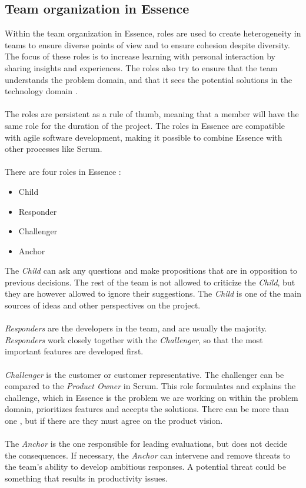 \subsection{Team organization in Essence}
\label{sec:team-organization}
Within the team organization in Essence, roles are used to create heterogeneity in teams to ensure diverse points of view and to ensure cohesion despite diversity.
The focus of these roles is to increase learning with personal interaction by sharing insights and experiences.
The roles also try to ensure that the team understands the problem domain, and that it sees the potential solutions in the technology domain \cite{Essence}.
\\\\
The roles are persistent as a rule of thumb, meaning that a member will have the same role for the duration of the project.
The roles in Essence are compatible with agile software development, making it possible to combine Essence with other processes like Scrum.
\\\\
There are four roles in Essence \cite{Essence}:
\begin{itemize}
    \item Child
    \item Responder
    \item Challenger
    \item Anchor
\end{itemize}
The \textit{Child} can ask any questions and make propositions that are in opposition to previous decisions.
The rest of the team is not allowed to criticize the \textit{Child}, but they are however allowed to ignore their suggestions.
The \textit{Child} is one of the main sources of ideas and other perspectives on the project.
\\\\
\textit{Responders} are the developers in the team, and are usually the majority.
\textit{Responders} work closely together with the \textit{Challenger}, so that the most important features are developed first.
\\\\
\textit{Challenger} is the customer or customer representative.
The challenger can be compared to the \textit{Product Owner} in Scrum.
This role formulates and explains the challenge, which in Essence is the problem we are working on within the problem domain, prioritizes features and accepts the solutions.
There can be more than one , but if there are they must agree on the product vision.
\\\\
The \textit{Anchor} is the one responsible for leading evaluations, but does not decide the consequences.
If necessary, the \textit{Anchor} can intervene and remove threats to the team's ability to develop ambitious responses.
A potential threat could be something that results in productivity issues.

